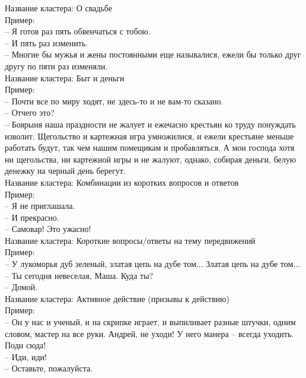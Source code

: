 \documentclass[a4paper,14pt]{article}
\begin{document}
Название кластера: О свадьбе\\
Пример: \\
-- Я готов раз пять обвенчаться с тобою. \\
-- И пять раз изменить. \\
-- Многие бы мужья и жены постоянными еще называлися, ежели бы только друг другу по пяти
              раз изменяли. \\



Название кластера: Быт и деньги\\
Пример: \\
-- Почти все по миру ходят, не здесь-то и не вам-то сказано. \\
-- Отчего это? \\
-- Боярыня наша праздности не жалует и ежечасно крестьян ко труду понуждать изволит.
              Щегольство и картежная игра умножилися, и ежели крестьяне меньше работать будут, так
              чем нашим помещикам и пробавляться. А мои господа хотя ни щегольства, ни картежной
              игры и не жалуют, однако, собирая деньги, белую денежку на черный день берегут. \\



Название кластера: Комбинации из коротких вопросов и ответов\\
Пример: \\
-- Я не приглашала. \\
-- И прекрасно. \\
-- Самовар! Это ужасно! \\



Название кластера: Короткие вопросы/ответы на тему передвижений\\
Пример: \\
-- У лукоморья дуб зеленый, златая цепь на дубе том... Златая цепь на дубе том... \\
-- Ты сегодня невеселая, Маша. Куда ты? \\
-- Домой. \\



Название кластера: Активное действие (призывы к действию)\\
Пример: \\
-- Он у нас и ученый, и на скрипке играет, и выпиливает разные штучки, одним словом,
              мастер на все руки. Андрей, не уходи! У него манера – всегда уходить. Поди сюда! \\
-- Иди, иди! \\
-- Оставьте, пожалуйста. \\
\end{document}
